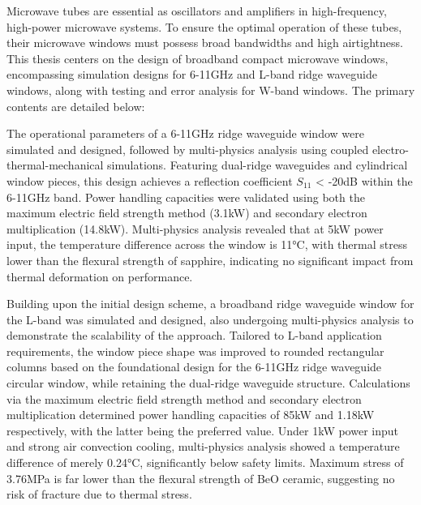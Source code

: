 \documentclass[master]{thesis-uestc}
\begin{document}
\begin{englishabstract}
Microwave tubes are essential as oscillators and amplifiers in high-frequency, high-power microwave systems. To ensure the optimal operation of these tubes, their microwave windows must possess broad bandwidths and high airtightness. This thesis centers on the design of broadband compact microwave windows, encompassing simulation designs for 6-11GHz and L-band ridge waveguide windows, along with testing and error analysis for W-band windows. The primary contents are detailed below:

The operational parameters of a 6-11GHz ridge waveguide window were simulated and designed, followed by multi-physics analysis using coupled electro-thermal-mechanical simulations. Featuring dual-ridge waveguides and cylindrical window pieces, this design achieves a reflection coefficient \(S_{11}\) < -20dB within the 6-11GHz band. Power handling capacities were validated using both the maximum electric field strength method (3.1kW) and secondary electron multiplication (14.8kW). Multi-physics analysis revealed that at 5kW power input, the temperature difference across the window is 11°C, with thermal stress lower than the flexural strength of sapphire, indicating no significant impact from thermal deformation on performance.

Building upon the initial design scheme, a broadband ridge waveguide window for the L-band was simulated and designed, also undergoing multi-physics analysis to demonstrate the scalability of the approach. Tailored to L-band application requirements, the window piece shape was improved to rounded rectangular columns based on the foundational design for the 6-11GHz ridge waveguide circular window, while retaining the dual-ridge waveguide structure. Calculations via the maximum electric field strength method and secondary electron multiplication determined power handling capacities of 85kW and 1.18kW respectively, with the latter being the preferred value. Under 1kW power input and strong air convection cooling, multi-physics analysis showed a temperature difference of merely 0.24°C, significantly below safety limits. Maximum stress of 3.76MPa is far lower than the flexural strength of BeO ceramic, suggesting no risk of fracture due to thermal stress.


\end{englishabstract}
\end{document}
